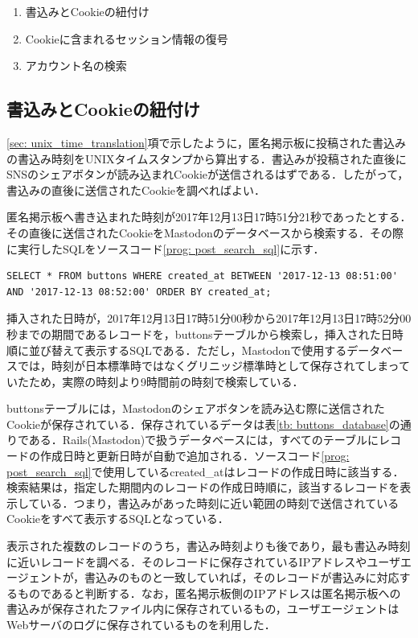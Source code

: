 \documentclass[10pt, a4paper]{jreport}
\begin{document}
\begin{enumerate}
\item{書込みとCookieの紐付け}
\item{Cookieに含まれるセッション情報の復号}
\item{アカウント名の検索}
\end{enumerate}

\subsection{書込みとCookieの紐付け}
\ref{sec: unix_time_translation}項で示したように，匿名掲示板に投稿された書込みの書込み時刻をUNIXタイムスタンプから算出する．書込みが投稿された直後にSNSのシェアボタンが読み込まれCookieが送信されるはずである．したがって，書込みの直後に送信されたCookieを調べればよい．

匿名掲示板へ書き込まれた時刻が2017年12月13日17時51分21秒であったとする．その直後に送信されたCookieをMastodonのデータベースから検索する．その際に実行したSQLをソースコード\ref{prog: post_search_sql}に示す．

\begin{lstlisting}[caption=2017年12月13日17時50分34秒にあった書込みに対応するCookieを検索するSQL,label=prog: post_search_sql]
SELECT * FROM buttons WHERE created_at BETWEEN '2017-12-13 08:51:00' AND '2017-12-13 08:52:00' ORDER BY created_at;
\end{lstlisting}

挿入された日時が，2017年12月13日17時51分00秒から2017年12月13日17時52分00秒までの期間であるレコードを，buttonsテーブルから検索し，挿入された日時順に並び替えて表示するSQLである．ただし，Mastodonで使用するデータベースでは，時刻が日本標準時ではなくグリニッジ標準時として保存されてしまっていたため，実際の時刻より9時間前の時刻で検索している．

buttonsテーブルには，Mastodonのシェアボタンを読み込む際に送信されたCookieが保存されている．保存されているデータは表\ref{tb: buttons_database}の通りである．Rails(Mastodon)で扱うデータベースには，すべてのテーブルにレコードの作成日時と更新日時が自動で追加される．ソースコード\ref{prog: post_search_sql}で使用しているcreated\_atはレコードの作成日時に該当する．検索結果は，指定した期間内のレコードの作成日時順に，該当するレコードを表示している．つまり，書込みがあった時刻に近い範囲の時刻で送信されているCookieをすべて表示するSQLとなっている．

表示された複数のレコードのうち，書込み時刻よりも後であり，最も書込み時刻に近いレコードを調べる．そのレコードに保存されているIPアドレスやユーザエージェントが，書込みのものと一致していれば，そのレコードが書込みに対応するものであると判断する．なお，匿名掲示板側のIPアドレスは匿名掲示板への書込みが保存されたファイル内に保存されているもの，ユーザエージェントはWebサーバのログに保存されているものを利用した．
\end{document}
